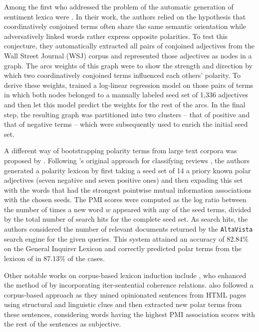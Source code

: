 Among the first who addressed the problem of the automatic generation
of sentiment lexica were \citet{Hatzivassi:97}.  In their work, the
authors relied on the hypothesis that coordinatively conjoined terms
often share the same semantic orientation while adversatively linked
words rather express opposite polarities.  To test this conjecture,
they automatically extracted all pairs of conjoined adjectives from
the Wall Street Journal (WSJ) corpus and represented those adjectives
as nodes in a graph.  The arcs weights of this graph were to show the
strength and direction by which two coordinatively conjoined terms
influenced each others' polarity.  To derive these weights,
\citeauthor{Hatzivassi:97} trained a log-linear regression model on
those pairs of terms in which both nodes belonged to a manually
labeled seed set of 1,336 adjectives and then let this model predict
the weights for the rest of the arcs.  In the final step, the
resulting graph was partitioned into two clusters -- that of positive
and that of negative terms -- which were subsequently used to enrich
the initial seed set.

A different way of bootstrapping polarity terms from large text
corpora was proposed by \citet{Turney:03}.  Following
\citeauthor{Turney:02}'s original approach for classifying reviews
\citep{Turney:02}, the authors generated a polarity lexicon by first
taking a seed set of 14 a priory known polar adjectives (seven
negative and seven positive ones) and then expading this set with the
words that had the strongest pointwise mutual information associations
with the chosen seeds.  The PMI scores were computed as the log ratio
between the number of times a new word $w$ appeared with any of the
seed terms, divided by the total number of search hits for the
complete seed set.  As search hits, the authors considered the number
of relevant documents returned by the \texttt{AltaVista} search engine
for the given queries.  This system attained an accuracy of 82.84\% on
the General Inquirer Lexicon \citep{Stone:66} and correctly predicted
polar terms from the lexicon of \cite{Hatzivassi:97} in 87.13\% of the
cases. %

Other notable works on corpus-based lexicon induction include
\citet{Kanayama:06}, who enhanced the method of
\citeauthor{Hatzivassi:97} by incorporating iter-sentential coherence
relations.  \citet{Kaji:07} also followed a corpus-based approach as
they mined opinionated sentences from HTML pages using structural and
linguistic clues and then extracted new polar terms from these
sentences, considering words having the highest PMI association scores
with the rest of the sentences as subjective.

